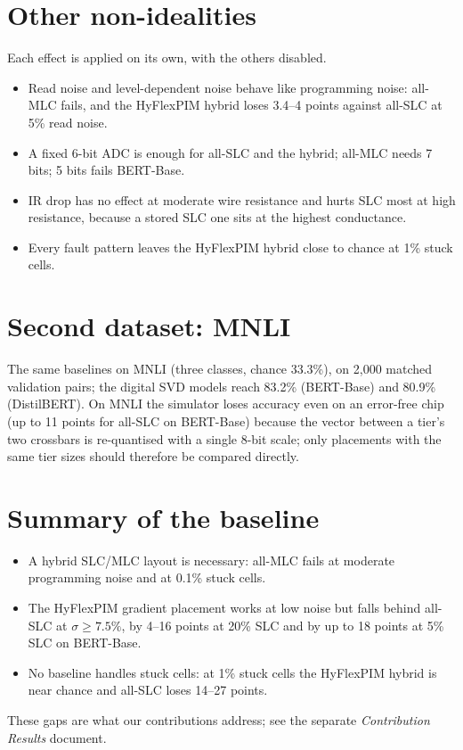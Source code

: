 \documentclass[10pt,a4paper]{article}
\begin{document}
\section{Other non-idealities}
Each effect is applied on its own, with the others disabled.

\begin{itemize}
\item Read noise and level-dependent noise behave like programming noise: all-MLC fails, and the HyFlexPIM
hybrid loses 3.4--4 points against all-SLC at 5\% read noise.
\item A fixed 6-bit ADC is enough for all-SLC and the hybrid; all-MLC needs 7 bits; 5 bits fails BERT-Base.
\item IR drop has no effect at moderate wire resistance and hurts SLC most at high resistance, because a stored
SLC one sits at the highest conductance.
\item Every fault pattern leaves the HyFlexPIM hybrid close to chance at 1\% stuck cells.
\end{itemize}

\section{Second dataset: MNLI}
The same baselines on MNLI (three classes, chance 33.3\%), on 2{,}000 matched validation pairs; the digital SVD
models reach 83.2\% (BERT-Base) and 80.9\% (DistilBERT). On MNLI the simulator loses accuracy even on an error-free
chip (up to 11 points for all-SLC on BERT-Base) because the vector between a tier's two crossbars is
re-quantised with a single 8-bit scale; only placements with the same tier sizes should therefore be compared
directly.


\section{Summary of the baseline}
\begin{itemize}
\item A hybrid SLC/MLC layout is necessary: all-MLC fails at moderate programming noise and at 0.1\% stuck cells.
\item The HyFlexPIM gradient placement works at low noise but falls behind all-SLC at $\sigma\geq7.5\%$, by 4--16
points at 20\% SLC and by up to 18 points at 5\% SLC on BERT-Base.
\item No baseline handles stuck cells: at 1\% stuck cells the HyFlexPIM hybrid is near chance and all-SLC loses
14--27 points.
\end{itemize}
These gaps are what our contributions address; see the separate \emph{Contribution Results} document.
\end{document}
